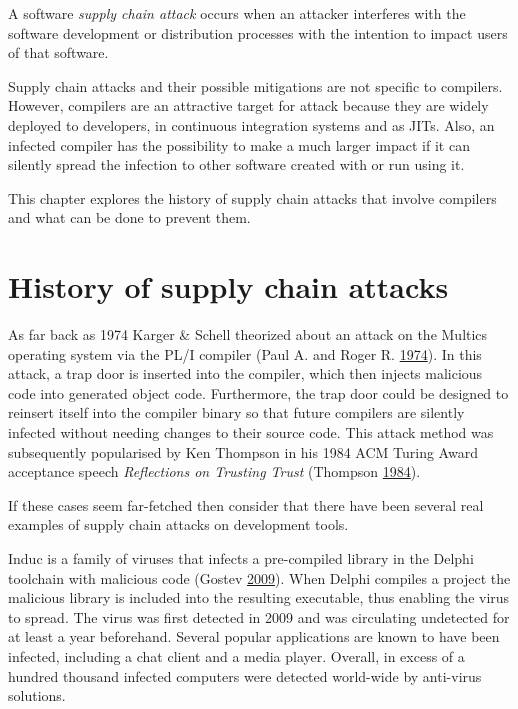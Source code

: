 \documentclass[a4paper,]{report}
\begin{document}
A software \emph{supply chain attack} occurs when an attacker interferes
with the software development or distribution processes with the
intention to impact users of that software.

Supply chain attacks and their possible mitigations are not specific to
compilers. However, compilers are an attractive target for attack
because they are widely deployed to developers, in continuous
integration systems and as JITs. Also, an infected compiler has the
possibility to make a much larger impact if it can silently spread the
infection to other software created with or run using it.

This chapter explores the history of supply chain attacks that involve
compilers and what can be done to prevent them.

\hypertarget{history-of-supply-chain-attacks}{%
\section{History of supply chain
attacks}\label{history-of-supply-chain-attacks}}

As far back as 1974 Karger \& Schell theorized about an attack on the
Multics operating system via the PL/I compiler (Paul A. and Roger R.
\protect\hyperlink{ref-Karger1974}{1974}). In this attack, a trap door
is inserted into the compiler, which then injects malicious code into
generated object code. Furthermore, the trap door could be designed to
reinsert itself into the compiler binary so that future compilers are
silently infected without needing changes to their source code. This
attack method was subsequently popularised by Ken Thompson in his 1984
ACM Turing Award acceptance speech \emph{Reflections on Trusting Trust}
(Thompson \protect\hyperlink{ref-Thompson1984}{1984}).

If these cases seem far-fetched then consider that there have been
several real examples of supply chain attacks on development tools.

Induc is a family of viruses that infects a pre-compiled library in the
Delphi toolchain with malicious code (Gostev
\protect\hyperlink{ref-Gostev2009}{2009}). When Delphi compiles a
project the malicious library is included into the resulting executable,
thus enabling the virus to spread. The virus was first detected in 2009
and was circulating undetected for at least a year beforehand. Several
popular applications are known to have been infected, including a chat
client and a media player. Overall, in excess of a hundred thousand
infected computers were detected world-wide by anti-virus solutions.
\end{document}
